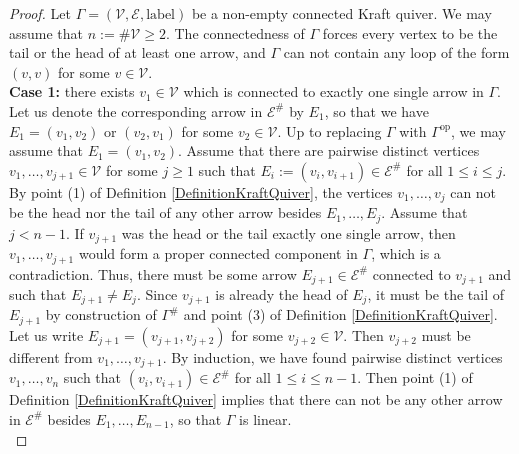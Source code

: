 \documentclass[12pt]{amsart}
\theoremstyle{definition}
\newcommand{\<}{\langle}   %
\renewcommand{\>}{\rangle} %
\begin{document}
\begin{proof}
    Let $\Gamma = (\mathcal V, \mathcal E, \mathrm{label})$ be a non-empty connected Kraft quiver. We may assume that $n := \#\mathcal V \geq 2$. The connectedness of $\Gamma$ forces every vertex to be the tail or the head of at least one arrow, and $\Gamma$ can not contain any loop of the form $(v,v)$ for some $v\in \mathcal V$.\\
    
    \textbf{Case 1:} there exists $v_1 \in \mathcal V$ which is connected to exactly one single arrow in $\Gamma$. Let us denote the corresponding arrow in $\mathcal E^{\#}$ by $E_1$, so that we have $E_1 = (v_1,v_2)$ or $(v_2,v_1)$ for some $v_2 \in \mathcal V$. Up to replacing $\Gamma$ with $\Gamma^{\mathrm{op}}$, we may assume that $E_1 = (v_1,v_2)$. Assume that there are pairwise distinct vertices $v_1,\ldots ,v_{j+1} \in \mathcal V$ for some $j\geq 1$ such that $E_i := (v_i,v_{i+1}) \in \mathcal E^{\#}$ for all $1 \leq i \leq j$. By point (1) of Definition \ref{DefinitionKraftQuiver}, the vertices $v_1,\ldots , v_j$ can not be the head nor the tail of any other arrow besides $E_1,\ldots , E_j$. Assume that $j<n-1$. If $v_{j+1}$ was the head or the tail exactly one single arrow, then $v_1,\ldots ,v_{j+1}$ would form a proper connected component in $\Gamma$, which is a contradiction. Thus, there must be some arrow $E_{j+1} \in \mathcal E^{\#}$ connected to $v_{j+1}$ and such that $E_{j+1} \not = E_j$. Since $v_{j+1}$ is already the head of $E_j$, it must be the tail of $E_{j+1}$ by construction of $\Gamma^{\#}$ and point (3) of Definition \ref{DefinitionKraftQuiver}. Let us write $E_{j+1} = (v_{j+1},v_{j+2})$ for some $v_{j+2} \in \mathcal V$. Then $v_{j+2}$ must be different from $v_1,\ldots , v_{j+1}$. By induction, we have found pairwise distinct vertices $v_1,\ldots , v_{n}$ such that $(v_i,v_{i+1}) \in \mathcal E^{\#}$ for all $1 \leq i \leq n-1$. Then point (1) of Definition \ref{DefinitionKraftQuiver} implies that there can not be any other arrow in $\mathcal E^{\#}$ besides $E_1,\ldots , E_{n-1}$, so that $\Gamma$ is linear.\\
    

\end{proof}
\end{document}

